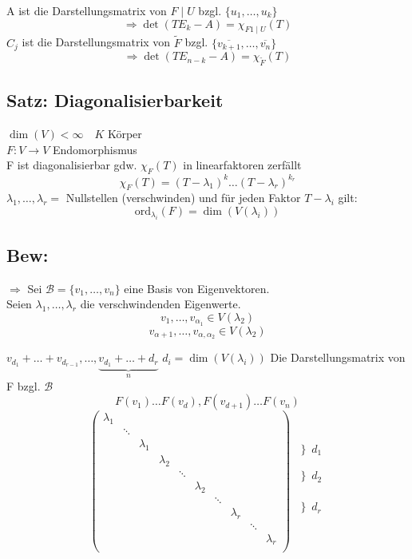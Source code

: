 \documentclass[titlepage,12pt,a4paper,ngerman]{report}
\newcommand{\ub}[1]{\underbrace{#1}}
\begin{document}
A ist die Darstellungsmatrix von $ F \mid U $ bzgl. $\{u_1, \dots, u_k\}$ 
$$ \Rightarrow \det (TE_k -A) = \chi_{F 1 \mid U}(T)$$
$C_j$ ist die Darstellungsmatrix von $\tilde{F}$ bzgl. $\{\overline{v_{k+1}}, \dots, \overline{v_n}\}$\\
$$ \Rightarrow \det (TE_{n-k}-A) = \chi_{\tilde{F}}(T)$$
\subsection{Satz: Diagonalisierbarkeit}
$\dim(V) < \infty \quad K$ Körper \\
$ F: V\to V$ Endomorphismus\\
F ist diagonalisierbar gdw. $\chi_{F}(T)$ in linearfaktoren zerfällt
$$\chi_{F}(T) = (T-\lambda_1)^k \dots (T-\lambda_r)^{k_r}$$
$\lambda_1, \dots, \lambda_r = $ Nullstellen (verschwinden)
und für jeden Faktor $T-\lambda_i$ gilt:
$$\textrm{ord}_{\lambda_i}(F) = \dim(V(\lambda_i))$$

\subsection{Bew:}
$\Rightarrow$ Sei $\mathcal{B}= \{v_1,\dots,v_n\}$ eine Basis von Eigenvektoren.\\
Seien $\lambda_1,\dots,\lambda_r$ die verschwindenden Eigenwerte.
$$v_1,\dots,v_{\alpha_1} \in V(\lambda_2)$$
$$v_{\alpha + 1}, \dots , v_{\alpha, \alpha_2} \in V(\lambda_2)$$

$v_{d_1}+ \dots + v_{d_{r-1}}, \dots , \ub{v_{d_1}+ \dots + d_r}_{n}$
$d_i = \dim(V(\lambda_i))$
Die Darstellungsmatrix von F bzgl. $\mathcal{B}$
$$F(v_1) \dots F(v_d), F(v_{d+1}) \dots F(v_n)$$ 
$$\begin{pmatrix}
\lambda_1\\
& \ddots\\
& & \lambda_1\\
& & & \lambda_2\\
& & & &\ddots\\
& & & & & \lambda_2\\
& & & & & &\ddots\\
& & & & & & & \lambda_r\\
& & & & & & & & \ddots \\
& & & & & & & & & \lambda_r\\
\end{pmatrix}\begin{matrix}
\\
\left\}d_1 \right.\\
\\
\\
\left\}d_2 \right.\\
\\
\\
\\
\left\}d_r \right.\\
\\
\end{matrix}$$
\end{document}
